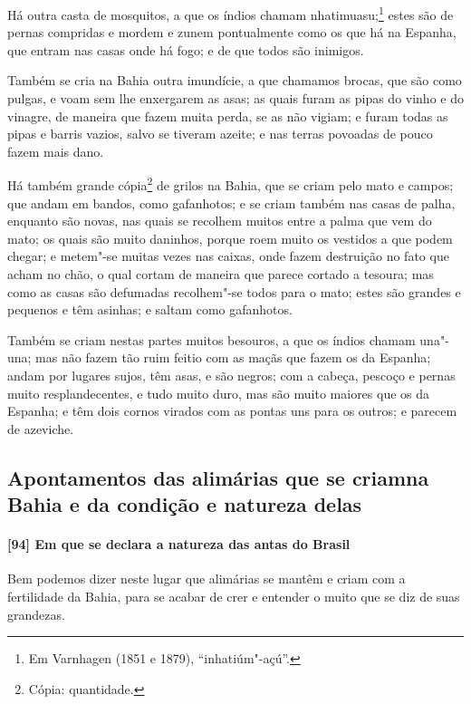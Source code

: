 Há outra casta de mosquitos, a que os índios chamam nhatimuasu;\footnote{ Em Varnhagen
(1851 e 1879), ``inhatiúm"-açú''.} estes são de pernas compridas e mordem e zunem
pontualmente como os que há na Espanha, que entram nas casas onde há fogo; e de que todos
são inimigos.

Também se cria na Bahia outra imundície, a que chamamos brocas, que são como pulgas, e
voam sem lhe enxergarem as asas; as quais furam as pipas do vinho e do vinagre, de maneira
que fazem muita perda, se as não vigiam; e furam todas as pipas e barris vazios, salvo se
tiveram azeite; e nas terras povoadas de pouco fazem mais dano.

Há também grande cópia\footnote{ Cópia: quantidade.} de grilos na Bahia, que se criam pelo
mato e campos; que andam em bandos, como gafanhotos; e se criam também nas
casas de palha, enquanto são novas, nas quais se recolhem muitos entre a palma que vem do
mato; os quais são muito daninhos, porque roem muito os vestidos a que podem chegar; e
metem"-se muitas vezes nas caixas, onde fazem destruição no fato que acham no chão, o qual
cortam de maneira que parece cortado a tesoura; mas como as casas são defumadas
recolhem"-se todos para o mato; estes são grandes e pequenos e têm asinhas; e saltam como
gafanhotos.

Também se criam nestas partes muitos besouros, a que os índios chamam una"-una; mas não
fazem tão ruim feitio com as maçãs que fazem os da Espanha; andam por lugares sujos, têm
asas, e são negros; com a cabeça, pescoço e pernas muito resplandecentes, e tudo muito
duro, mas são muito maiores que os da Espanha; e têm dois cornos virados com as pontas uns
para os outros; e parecem de azeviche.

\subsection{Apontamentos das alimárias que se criam\break na Bahia e da condição e natureza
delas}

\paragraph{[94] Em que se declara a natureza das antas do Brasil}\quad
Bem podemos dizer neste lugar que alimárias se mantêm e criam com a fertilidade da Bahia,
para se acabar de crer e entender o muito que se diz de suas grandezas.

